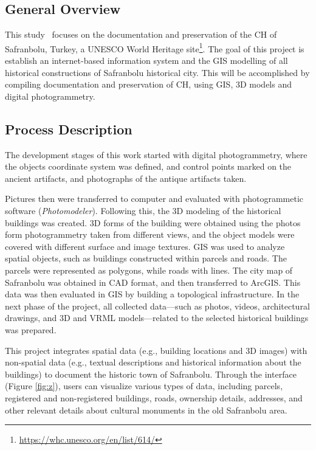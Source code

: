\subsection*{General Overview}

This study~\cite{arca2018development} focuses on the documentation and preservation of the \gls{CH} of Safranbolu, Turkey, a UNESCO World Heritage site\footnote{\url{https://whc.unesco.org/en/list/614/}}. 
The goal of this project is establish an internet-based information system and the \gls{GIS} modelling of all historical constructions of Safranbolu historical city.
This will be accomplished by compiling documentation and preservation of \gls{CH}, using \gls{GIS}, \gls{3D} models and digital photogrammetry.

\subsection*{Process Description}

The development stages of this work started with digital photogrammetry, where the objects coordinate system was defined, and control points marked on the ancient artifacts, and photographs of the antique artifacts taken.

Pictures then were transferred to computer and evaluated with photogrammetic software (\textit{Photomodeler}). Following this, the \gls{3D} modeling of the historical buildings was created.
\gls{3D} forms of the building were obtained using the photos form photogrammetry taken from different views, and the object models were covered with different surface and image textures.
\gls{GIS} was used to analyze spatial objects, such as buildings constructed within parcels and roads. The parcels were represented as polygons, while roads with lines.
The city map of Safranbolu was obtained in \gls{CAD} format, and then transferred to ArcGIS. This data was then evaluated in \gls{GIS} by building a topological infrastructure.
In the next phase of the project, all collected data—such as photos, videos, architectural drawings, and \gls{3D} and \gls{VRML} models—related to the selected historical buildings was prepared. 

This project integrates spatial data (e.g., building locations and \gls{3D} images) with non-spatial data (e.g., textual descriptions and historical information about the buildings) to document the historic town of Safranbolu. 
Through the interface (Figure \ref{fig:z}), users can visualize various types of data, including parcels, registered and non-registered buildings, roads, ownership details, addresses, and other relevant details about cultural monuments in the old Safranbolu area.


